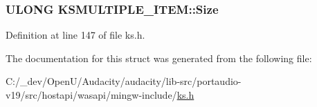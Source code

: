\subsubsection[{\texorpdfstring{Size}{Size}}]{\setlength{\rightskip}{0pt plus 5cm}U\+L\+O\+NG K\+S\+M\+U\+L\+T\+I\+P\+L\+E\+\_\+\+I\+T\+E\+M\+::\+Size}\hypertarget{struct_k_s_m_u_l_t_i_p_l_e___i_t_e_m_a54498b17fc44b94f5d3aa99b26310234}{}\label{struct_k_s_m_u_l_t_i_p_l_e___i_t_e_m_a54498b17fc44b94f5d3aa99b26310234}


Definition at line 147 of file ks.\+h.



The documentation for this struct was generated from the following file\+:\begin{DoxyCompactItemize}
\item 
C\+:/\+\_\+dev/\+Open\+U/\+Audacity/audacity/lib-\/src/portaudio-\/v19/src/hostapi/wasapi/mingw-\/include/\hyperlink{ks_8h}{ks.\+h}\end{DoxyCompactItemize}
